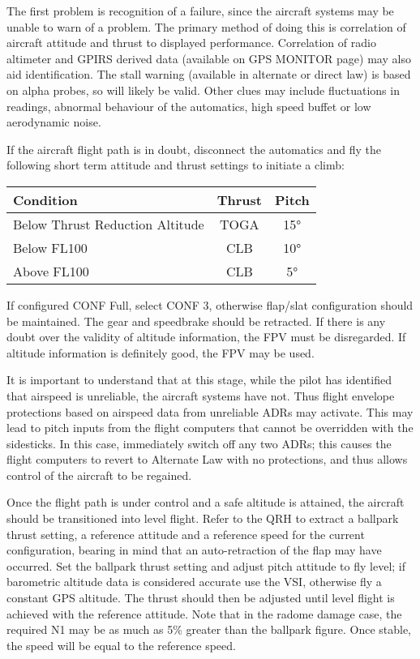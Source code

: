\documentclass[a5paper,11pt,twoside]{book}
\begin{document}
The first problem is recognition of a failure, since the aircraft systems may be
unable to warn of a problem. The primary method of doing this is correlation of
aircraft attitude and thrust to displayed performance. Correlation of radio
altimeter and GPIRS derived data (available on GPS MONITOR page) may also aid
identification. The stall warning (available in alternate or direct law) is
based on alpha probes, so will likely be valid. Other clues may include
fluctuations in readings, abnormal behaviour of the automatics, high speed
buffet or low aerodynamic noise.

If the aircraft flight path is in doubt, disconnect the automatics and fly the
following short term attitude and thrust settings to initiate a climb:

\medskip
\begin{tabular}{|l|c|c|}
  \hline
  \textbf{Condition} & \textbf{Thrust} & \textbf{Pitch}\\
  \hline
  Below Thrust Reduction Altitude & TOGA & 15°\\
  \hline
  Below FL100 & CLB & 10°\\
  \hline
  Above FL100 & CLB & 5°\\
  \hline
\end{tabular}
\medskip

If configured CONF Full, select CONF 3, otherwise flap/slat configuration should
be maintained. The gear and speedbrake should be retracted. If there is any
doubt over the validity of altitude information, the FPV must be disregarded. If
altitude information is definitely good, the FPV may be used.

It is important to understand that at this stage, while the pilot has identified
that airspeed is unreliable, the aircraft systems have not. Thus flight envelope
protections based on airspeed data from unreliable ADRs may activate. This may
lead to pitch inputs from the flight computers that cannot be overridden with
the sidesticks. In this case, immediately switch off any two ADRs; this causes
the flight computers to revert to Alternate Law with no protections, and thus
allows control of the aircraft to be regained.

Once the flight path is under control and a safe altitude is attained, the
aircraft should be transitioned into level flight. Refer to the QRH to
extract a ballpark thrust setting, a reference attitude and a reference speed
for the current configuration, bearing in mind that an auto-retraction of the
flap may have occurred. Set the ballpark thrust setting and adjust pitch
attitude to fly level; if barometric altitude data is considered accurate use
the VSI, otherwise fly a constant GPS altitude. The thrust should then be
adjusted until level flight is achieved with the reference attitude. Note that
in the radome damage case, the required N1 may be as much as 5\% greater than
the ballpark figure. Once stable, the speed will be equal to the reference
speed.
\end{document}
